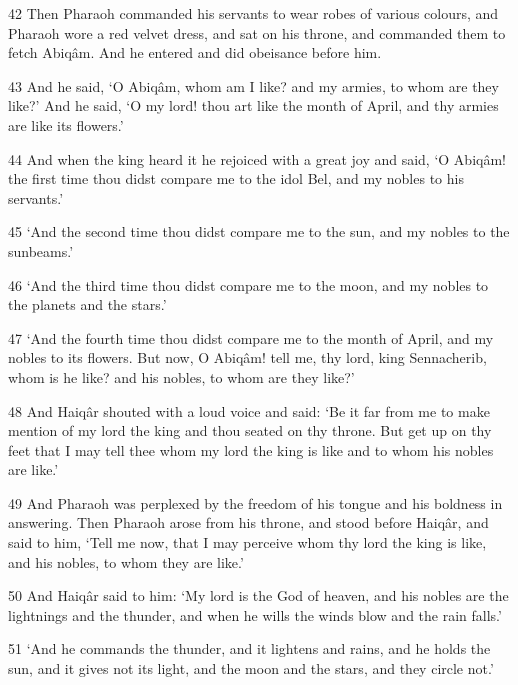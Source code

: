 \par 42 Then Pharaoh commanded his servants to wear robes of various colours, and Pharaoh wore a red velvet dress, and sat on his throne, and commanded them to fetch Abiqâm. And he entered and did obeisance before him.

\par 43 And he said, ‘O Abiqâm, whom am I like? and my armies, to whom are they like?’ And he said, ‘O my lord! thou art like the month of April, and thy armies are like its flowers.’

\par 44 And when the king heard it he rejoiced with a great joy and said, ‘O Abiqâm! the first time thou didst compare me to the idol Bel, and my nobles to his servants.’

\par 45 ‘And the second time thou didst compare me to the sun, and my nobles to the sunbeams.’

\par 46 ‘And the third time thou didst compare me to the moon, and my nobles to the planets and the stars.’

\par 47 ‘And the fourth time thou didst compare me to the month of April, and my nobles to its flowers. But now, O Abiqâm! tell me, thy lord, king Sennacherib, whom is he like? and his nobles, to whom are they like?’

\par 48 And Haiqâr shouted with a loud voice and said: ‘Be it far from me to make mention of my lord the king and thou seated on thy throne. But get up on thy feet that I may tell thee whom my lord the king is like and to whom his nobles are like.’

\par 49 And Pharaoh was perplexed by the freedom of his tongue and his boldness in answering. Then Pharaoh arose from his throne, and stood before Haiqâr, and said to him, ‘Tell me now, that I may perceive whom thy lord the king is like, and his nobles, to whom they are like.’

\par 50 And Haiqâr said to him: ‘My lord is the God of heaven, and his nobles are the lightnings and the thunder, and when he wills the winds blow and the rain falls.’

\par 51 ‘And he commands the thunder, and it lightens and rains, and he holds the sun, and it gives not its light, and the moon and the stars, and they circle not.’

